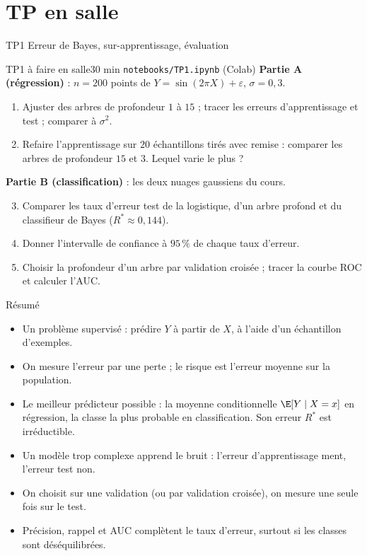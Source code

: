 \documentclass[aspectratio=169,11pt]{beamer}
\begin{document}
\section{TP en salle}

\begin{frame}{TP1 \textendash{} Erreur de Bayes, sur-apprentissage, évaluation}
  \footnotesize
  \begin{tp}{TP1 \textendash{} à faire en salle}{30 min \textperiodcentered{} \texttt{notebooks/TP1.ipynb} (Colab)}
    \textbf{Partie A (régression)} : $n=200$ points de $Y=\sin(2\pi X)+\varepsilon$, $\sigma=0{,}3$.
    \begin{enumerate}\setlength\itemsep{0pt}
      \item Ajuster des arbres de profondeur $1$ à $15$ ; tracer les erreurs d'apprentissage et test ; comparer à $\sigma^2$.
      \item Refaire l'apprentissage sur $20$ échantillons tirés avec remise : comparer les arbres de profondeur $15$ et $3$. Lequel varie le plus ?
    \end{enumerate}
    \textbf{Partie B (classification)} : les deux nuages gaussiens du cours.
    \begin{enumerate}\setcounter{enumi}{2}\setlength\itemsep{0pt}
      \item Comparer les taux d'erreur test de la logistique, d'un arbre profond et du classifieur de Bayes ($R^*\approx0{,}144$).
      \item Donner l'intervalle de confiance à $95\,\%$ de chaque taux d'erreur.
      \item Choisir la profondeur d'un arbre par validation croisée ; tracer la courbe ROC et calculer l'AUC.
    \end{enumerate}
  \end{tp}
\end{frame}

\begin{frame}{Résumé}
  \begin{itemize}
    \item Un problème supervisé : prédire $Y$ à partir de $X$, à l'aide d'un échantillon d'exemples.
    \item On mesure l'erreur par une perte ; le risque est l'erreur moyenne sur la population.
    \item Le meilleur prédicteur possible : la moyenne conditionnelle $\E[Y\mid X=x]$ en régression, la classe la plus probable en classification. Son erreur $R^*$ est irréductible.
    \item Un modèle trop complexe apprend le bruit : l'erreur d'apprentissage ment, l'erreur test non.
    \item On choisit sur une validation (ou par validation croisée), on mesure une seule fois sur le test.
    \item Précision, rappel et AUC complètent le taux d'erreur, surtout si les classes sont déséquilibrées.
  \end{itemize}
\end{frame}
\end{document}
